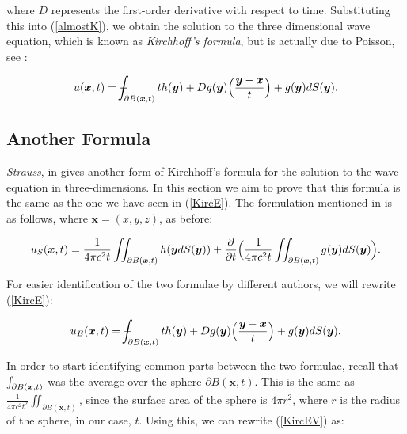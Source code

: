 \documentclass[a4paper, 12pt]{article}
\def\Xint#1{\mathchoice
{\XXint\displaystyle\textstyle{#1}}%
{\XXint\textstyle\scriptstyle{#1}}%
{\XXint\scriptstyle\scriptscriptstyle{#1}}%
{\XXint\scriptscriptstyle\scriptscriptstyle{#1}}%
\!\int}
\def\XXint#1#2#3{{\setbox0=\hbox{$#1{#2#3}{\int}$ }
\vcenter{\hbox{$#2#3$ }}\kern-.6\wd0}}
\def\dashint{\Xint-}
\numberwithin{equation}{section}
\begin{document}
where $D$ represents the first-order derivative with respect to time. Substituting this into (\ref{almostK}), we obtain the solution to the three dimensional wave equation, which is known as \emph{Kirchhoff's formula}, but is 
actually due to Poisson, see \cite{Str}:

\begin{equation} \label{KircE}
    u(\boldsymbol{x},t)=\dashint_{\partial B(\boldsymbol{x},t)} th(\boldsymbol{y})+Dg(\boldsymbol{y})\Big(\frac{\boldsymbol{y}-\boldsymbol{x}}{t}\Big)+g(\boldsymbol{y})dS(\boldsymbol{y}).
\end{equation}

\subsection{Another Formula}
\emph{Strauss}, in \cite{Str} gives another form of Kirchhoff's formula for the solution to the wave equation in three-dimensions. In this section we aim to prove that 
this formula is the same as the one we have seen in (\ref{KircE}). The formulation mentioned in \cite{Str} is as follows, where $\boldsymbol{x}=(x,y,z)$, as before:

\begin{equation} \label{KircSTR}
    u_S(\boldsymbol{x}, t)=\frac{1}{4 \pi c^2 t}\iint_{\partial B(\boldsymbol{x}, t)} h(\boldsymbol{y}dS(\boldsymbol{y}))+\diffp[1]{}{t}\Big( \frac{1}{4 \pi c^2 t}\iint_{\partial B(\boldsymbol{x}, t)} g(\boldsymbol{y})dS(\boldsymbol{y})\Big).
\end{equation}

For easier identification of the two formulae by different authors, we will rewrite (\ref{KircE}): 

\begin{equation} \label{KircEV}
    u_E(\boldsymbol{x},t)=\dashint_{\partial B(\boldsymbol{x},t)} th(\boldsymbol{y})+Dg(\boldsymbol{y})\Big(\frac{\boldsymbol{y}-\boldsymbol{x}}{t}\Big)+g(\boldsymbol{y})dS(\boldsymbol{y}).
\end{equation}

In order to start identifying common parts between the two formulae, recall that $\dashint_{\partial B(\boldsymbol{x}, t)}$ was the average over the sphere $\partial B(\boldsymbol{x}, t)$.
This is the same as $\frac{1}{4 \pi c^2 t^2}\iint_{\partial B(\boldsymbol{x}, t)}$, since the surface area of the sphere is $4\pi r^2$, where $r$ is the radius of the sphere, 
in our case, $t$. Using this, we can rewrite (\ref{KircEV}) as:
\end{document}
